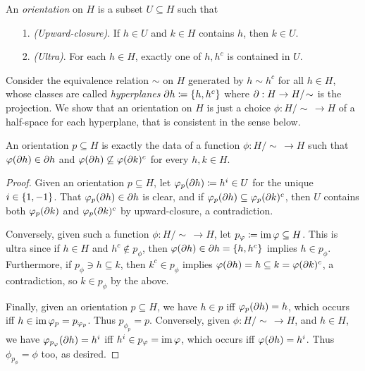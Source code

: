 \documentclass{amsart}
\begin{document}
    \begin{definition}
        An \textit{orientation} on $H$ is a subset $U\subseteq H$ such that
        \begin{enumerate}
            \item[1.] \textit{(Upward-closure)}. If $h\in U$ and $k\in H$ contains $h$, then $k\in U$.
            \item[2.] \textit{(Ultra)}. For each $h\in H$, exactly one of $h,h^c$ is contained in $U$.
        \end{enumerate}
    \end{definition}

    Consider the equivalence relation $\sim$ on $H$ generated by $h\sim h^c$ for all $h\in H$, whose classes are called \textit{hyperplanes} $\partial h\coloneqq\left\{h,h^c\right\}$ where $\partial:H\to H/\!\sim$ is the projection. We show that an orientation on $H$ is just a choice $\phi:H/\!\sim\,\to H$ of a half-space for each hyperplane, that is consistent in the sense below.

    \begin{proposition}\label{correspondence}
        An orientation $p\subseteq H$ is exactly the data of a function $\phi:H/\!\sim\,\to H$ such that $\varphi(\partial h)\in\partial h$ and $\varphi(\partial h)\not\subseteq\varphi(\partial k)^c$ for every $h,k\in H$.
    \end{proposition}
    \begin{proof}
        Given an orientation $p\subseteq H$, let $\varphi_p(\partial h)\coloneqq h^i\in U$ for the unique $i\in\left\{1,-1\right\}$. That $\varphi_p(\partial h)\in\partial h$ is clear, and if $\varphi_p(\partial h)\subseteq\varphi_p(\partial k)^c$, then $U$ contains both $\varphi_p(\partial k)$ and $\varphi_p(\partial k)^c$ by upward-closure, a contradiction.

        Conversely, given such a function $\phi:H/\!\sim\,\to H$, let $p_\varphi\coloneqq\operatorname{im}\varphi\subseteq H$. This is ultra since if $h\in H$ and $h^c\not\in p_\phi$, then $\varphi(\partial h)\in\partial h=\left\{h,h^c\right\}$ implies $h\in p_\phi$. Furthermore, if $p_\phi\ni h\subseteq k$, then $k^c\in p_\phi$ implies $\varphi(\partial h)=h\subseteq k=\varphi(\partial k)^c$, a contradiction, so $k\in p_\phi$ by the above.

        Finally, given an orientation $p\subseteq H$, we have $h\in p$ iff $\varphi_p(\partial h)=h$, which occurs iff $h\in\operatorname{im}\varphi_p=p_{\varphi_p}$. Thus $p_{\phi_p}=p$. Conversely, given $\phi:H/\!\sim\,\to H$, and $h\in H$, we have $\varphi_{p_{\varphi}}(\partial h)=h^i$ iff $h^i\in p_\varphi=\operatorname{im}\varphi$, which occurs iff $\varphi(\partial h)=h^i$. Thus $\phi_{p_\phi}=\phi$ too, as desired.
    \end{proof}
\end{document}
